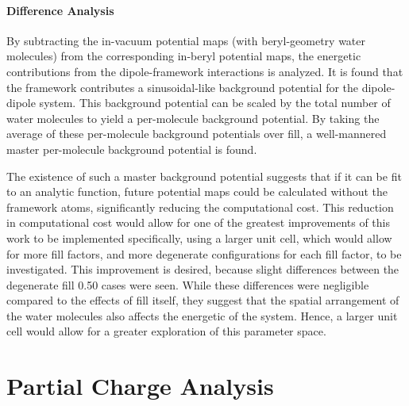 \paragraph{Difference Analysis} By subtracting the in-vacuum potential maps (with beryl-geometry water molecules) from the corresponding in-beryl potential maps, the energetic contributions from the dipole-framework interactions is analyzed. It is found that the framework contributes a sinusoidal-like background potential for the dipole-dipole system. This background potential can be scaled by the total number of water molecules to yield a per-molecule background potential. By taking the average of these per-molecule background potentials over fill, a well-mannered master per-molecule background potential is found. 

The existence of such a master background potential suggests that if it can be fit to an analytic function, future potential maps could be calculated without the framework atoms, significantly reducing the computational cost. This reduction in computational cost would allow for one of the greatest improvements of this work to be implemented \textemdash specifically, using a larger unit cell, which would allow for more fill factors, and more degenerate configurations for each fill factor, to be investigated. This improvement is desired, because slight differences between the degenerate fill 0.50 cases were seen. While these differences were negligible compared to the effects of fill itself, they suggest that the spatial arrangement of the water molecules also affects the energetic of the system. Hence, a larger unit cell would allow for a greater exploration of this parameter space.

\section{Partial Charge Analysis}